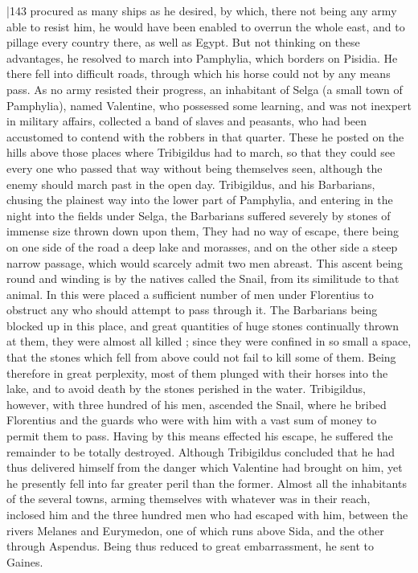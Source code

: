 |143 procured as many ships as he desired, by which, there not being any army able to resist him, he would have been enabled to overrun the whole east, and to pillage every country there, as well as Egypt. But not thinking on these advantages, he resolved to march into Pamphylia, which borders on Pisidia. He there fell into difficult roads, through which his horse could not by any means pass. As no army resisted their progress, an inhabitant of Selga (a small town of Pamphylia), named Valentine, who possessed some learning, and was not inexpert in military affairs, collected a band of slaves and peasants, who had been accustomed to contend with the robbers in that quarter. These he posted on the hills above those places where Tribigildus had to march, so that they could see every one who passed that way without being themselves seen, although the enemy should march past in the open day. Tribigildus, and his Barbarians, chusing the plainest way into the lower part of Pamphylia, and entering in the night into the fields under Selga, the Barbarians suffered severely by stones of immense size thrown down upon them, They had no way of escape, there being on one side of the road a deep lake and morasses, and on the other side a steep narrow passage, which would scarcely admit two men abreast. This ascent being round and winding is by the natives called the Snail, from its similitude to that animal. In this were placed a sufficient number of men under Florentius to obstruct any who should attempt to pass through it. The Barbarians being blocked up in this place, and great quantities of huge stones continually thrown at them, they were almost all killed ; since they were confined in so small a space, that the stones which fell from above could not fail to kill some of them. Being therefore in great perplexity, most of them plunged with their horses into the lake, and to avoid death by the stones perished in the water. Tribigildus, however, with three hundred of his men, ascended the Snail, where he bribed Florentius and the guards who were with him with a vast sum of money to permit them to pass. Having by this means effected his escape, he suffered the remainder to be totally destroyed. Although Tribigildus concluded that he had thus delivered himself from the danger which Valentine had brought on him, yet he presently fell into far greater peril than the former. Almost all the inhabitants of the several towns, arming themselves with whatever was in their reach, inclosed him and the three hundred men who had escaped with him, between the rivers Melanes and Eurymedon, one of which runs above Sida, and the other through Aspendus. Being thus reduced to great embarrassment, he sent to Gaines.
